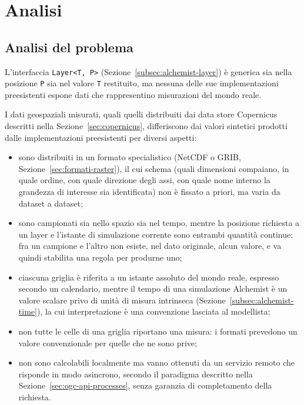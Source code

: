 \chapter{Analisi}
\label{chap:analisi}

\section{Analisi del problema}
\label{sec:analisi-problema}

L'interfaccia \texttt{Layer<T, P>} (Sezione~\ref{subsec:alchemist-layer}) è generica sia
nella posizione \texttt{P} sia nel valore \texttt{T} restituito, ma nessuna delle sue
implementazioni preesistenti espone dati che rappresentino misurazioni del mondo reale.

I dati geospaziali misurati, quali quelli distribuiti dai data store Copernicus descritti
nella Sezione~\ref{sec:copernicus}, differiscono dai valori sintetici prodotti dalle
implementazioni preesistenti per diversi aspetti:

\begin{itemize}
    \item sono distribuiti in un formato specialistico (\ac{NetCDF} o \ac{GRIB},
    Sezione~\ref{sec:formati-raster}), il cui schema (quali dimensioni compaiano, in quale
    ordine, con quale direzione degli assi, con quale nome interno la grandezza di interesse
    sia identificata) non è fissato a priori, ma varia da dataset a dataset;
    \item sono campionati sia nello spazio sia nel tempo, mentre la
    posizione richiesta a un layer e l'istante di simulazione corrente sono entrambi
    quantità continue: fra un campione e l'altro non esiste, nel dato
    originale, alcun valore, e va quindi stabilita una regola per produrne uno;
    \item ciascuna griglia è riferita a un istante assoluto del mondo reale, espresso
    secondo un calendario, mentre il tempo di una simulazione Alchemist è un valore scalare
    privo di unità di misura intrinseca (Sezione~\ref{subsec:alchemist-time}), la cui
    interpretazione è una convenzione lasciata al modellista;
    \item non tutte le celle di una griglia riportano una misura: i formati prevedono un
    valore convenzionale per quelle che ne sono prive;
    \item non sono calcolabili localmente ma vanno ottenuti da un
    servizio remoto che risponde in modo asincrono, secondo il paradigma descritto nella
    Sezione~\ref{sec:ogc-api-processes}, senza garanzia di completamento della richiesta.
\end{itemize}

